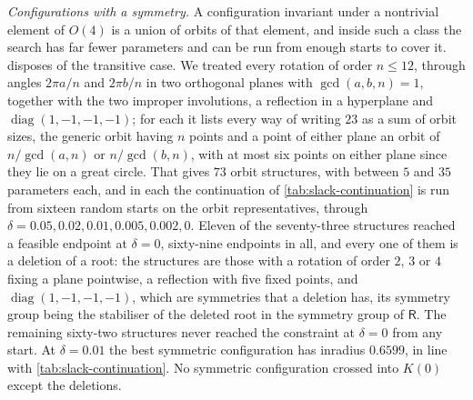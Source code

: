 \documentclass[11pt,reqno]{amsart}
\renewcommand{\_}{\origunderscore\allowbreak}
\numberwithin{equation}{section}
\theoremstyle{plain}
\theoremstyle{definition}
\theoremstyle{remark}
\newcommand{\Rt}{\mathsf{R}}                 %
\DeclareMathOperator{\diag}{diag}
\begin{document}
\smallskip\noindent\textit{Configurations with a symmetry.}
A configuration invariant under a nontrivial element of $O(4)$ is a
union of orbits of that element, and inside such a class the search has
far fewer parameters and can be run from enough starts to cover it.
 disposes of the transitive case. We treated
every rotation of order $n\le12$,
through angles $2\pi a/n$ and $2\pi b/n$ in two orthogonal planes with
$\gcd(a,b,n)=1$, together with the two improper involutions, a
reflection in a hyperplane and $\diag(1,-1,-1,-1)$; for each it lists
every way of writing $23$ as a sum of orbit sizes, the generic orbit
having $n$ points and a point of either plane an orbit of $n/\gcd(a,n)$
or $n/\gcd(b,n)$, with at most six points on either plane since they lie
on a great circle. That gives $73$ orbit structures, with between $5$
and $35$ parameters each, and in each the continuation of
\cref{tab:slack-continuation} is run from sixteen random starts on the
orbit representatives, through $\delta=0.05,0.02,0.01,0.005,0.002,0$.
Eleven of the seventy-three structures reached a feasible endpoint at
$\delta=0$, sixty-nine endpoints in all, and every one of them is a
deletion of a root: the structures are those with a rotation of order
$2$, $3$ or $4$ fixing a plane pointwise, a reflection with five fixed
points, and $\diag(1,-1,-1,-1)$, which are symmetries that a deletion
has, its symmetry group being the stabiliser of the deleted root in the
symmetry group of $\Rt$. The remaining sixty-two structures never reached
the constraint at $\delta=0$ from any start. At $\delta=0.01$ the best
symmetric configuration has inradius $0.6599$, in line with
\cref{tab:slack-continuation}. No symmetric configuration crossed into
$K(0)$ except the deletions.
\end{document}

